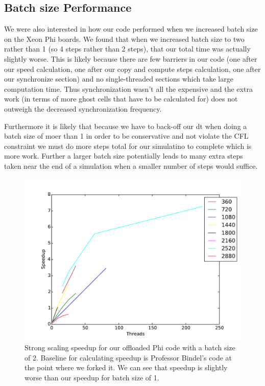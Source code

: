 \documentclass[11pt]{article}
\begin{document}
\subsection{Batch size Performance}

We were also interested in how our code performed when we increased batch size on the Xeon Phi boards. We found that when we increased batch size to two rather than 1 (so 4 steps rather than 2 steps), that our total time was actually slightly worse. This is likely because there are few barriers in our code (one after our speed calculation, one after our copy and compute steps calculation, one after our synchronize section) and no single-threaded sections which take large computation time. Thus synchronization wasn't all the expensive and the extra work (in terms of more ghost cells that have to be calculated for) does not outweigh the decreased synchronization frequency.

Furthermore it is likely that because we have to back-off our dt when doing a batch size of moer than 1 in order to be conservative and not violate the CFL constraint we must do more steps total for our simulatino to complete which is more work. Further a larger batch size potentially leads to many extra steps taken near the end of a simulation when a smaller number of steps would suffice.

\begin{figure}[h!]
\includegraphics[width=0.5\linewidth]{mic_strong_bindel_baseline_batchsize2.pdf}
\caption{Strong scaling speedup for our offloaded Phi code with a batch size of 2. Baseline for calculating speedup is Professor Bindel's code at the point where we forked it. We can see that speedup is slightly worse than our speedup for batch size of 1.}
\end{figure}
\end{document}
